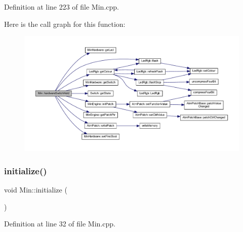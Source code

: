 Definition at line 223 of file Min.\+cpp.

Here is the call graph for this function\+:
\nopagebreak
\begin{figure}[H]
\begin{center}
\leavevmode
\includegraphics[width=350pt]{class_min_aa17c2510883d894f135d6a0582cc8bea_cgraph}
\end{center}
\end{figure}
\mbox{\label{class_min_a0fbb740ee813f44c6b0082d9a980875c}} 
\subsubsection{\texorpdfstring{initialize()}{initialize()}}
{\footnotesize\ttfamily void Min\+::initialize (\begin{DoxyParamCaption}{ }\end{DoxyParamCaption})}



Definition at line 32 of file Min.\+cpp.


